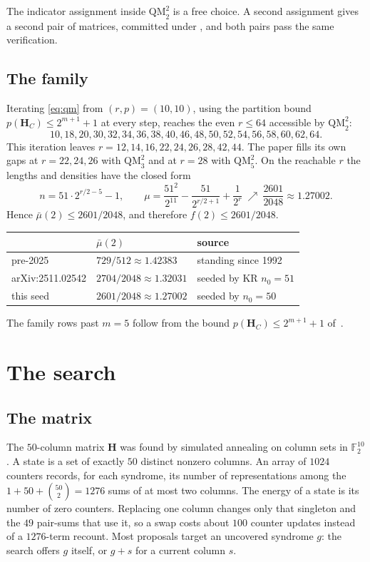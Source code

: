 \documentclass[11pt,a4paper]{article}
\newcommand{\FF}{\mathbb{F}}
\newcommand{\HH}{\boldsymbol{H}}
\begin{document}
The indicator assignment inside $\mathrm{QM}_2^2$ is a free choice. A
second assignment gives a second pair of matrices, committed under
, and both pairs pass the same verification.

\subsection{The family}

Iterating \eqref{eq:qm} from $(r,p)=(10,10)$, using the partition
bound $p(\HH_C)\le 2^{m+1}+1$ at every step, reaches the even $r\le 64$
accessible by $\mathrm{QM}_2^2$:
\[
10,18,20,30,32,34,36,38,40,46,48,50,52,54,56,58,60,62,64 .
\]
This iteration leaves $r=12,14,16,22,24,26,28,42,44$.
The paper fills its own gaps at $r=22,24,26$ with $\mathrm{QM}_3^2$ and
at $r=28$ with $\mathrm{QM}_5^2$. On the reachable $r$ the lengths and
densities have the closed form
\[
n=51\cdot 2^{r/2-5}-1,\qquad
\mu=\frac{51^2}{2^{11}}-\frac{51}{2^{r/2+1}}+\frac{1}{2^r}
\ \nearrow\ \frac{2601}{2048}\approx 1.27002 .
\]
Hence $\bar\mu(2)\le 2601/2048$, and therefore
$f(2)\le 2601/2048$.

\begin{center}
\renewcommand{\arraystretch}{1.15}
\begin{tabular}{@{}lll@{}}
\toprule
 & $\bar\mu(2)$ & source \\
\midrule
pre-2025 & $729/512\approx 1.42383$ & standing since 1992 \\
arXiv:2511.02542 & $2704/2048\approx 1.32031$ & seeded by KR $n_0=51$ \\
this seed & $2601/2048\approx 1.27002$ & seeded by $n_0=50$ \\
\bottomrule
\end{tabular}
\end{center}

The family rows past $m=5$ follow from the bound
$p(\HH_C)\le 2^{m+1}+1$ of~\cite{DMP2025}.

\section{The search}
\label{sec:search}

\subsection{The matrix}

The $50$-column matrix $\HH$ was found by simulated annealing on
column sets in $\FF_2^{10}$. A state is a set of exactly $50$ distinct
nonzero columns. An array of $1024$ counters records, for each
syndrome, its number of representations among the
$1+50+\binom{50}{2}=1276$ sums of at most two columns. The energy of a
state is its number of zero counters. Replacing one column changes
only that singleton and the $49$ pair-sums that use it, so a swap
costs about $100$ counter updates instead of a $1276$-term recount.
Most proposals target an uncovered syndrome $g$: the search offers $g$
itself, or $g+s$ for a current column $s$.
\end{document}
